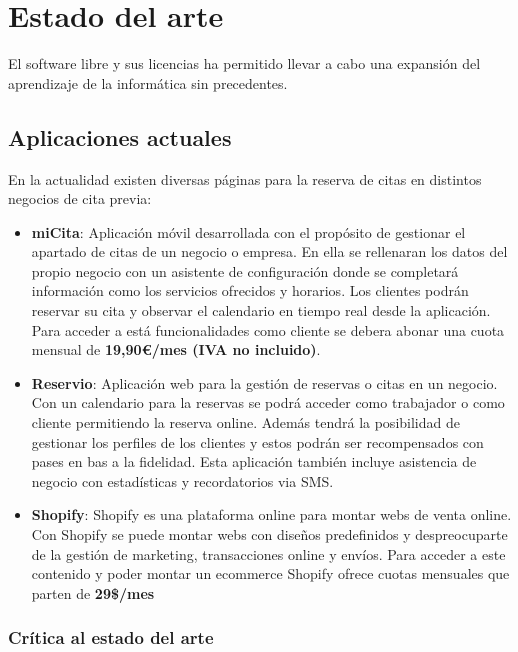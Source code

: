 \chapter{Estado del arte}

El software libre y sus licencias \cite{gplv3} ha permitido llevar a cabo una expansión del
aprendizaje de la informática sin precedentes.

\section{Aplicaciones actuales}

En la actualidad existen diversas páginas para la reserva de citas en distintos negocios de cita previa:

\vspace{-0.5em}
\begin{itemize}
    \item \textbf{miCita}: Aplicación móvil desarrollada con el propósito de gestionar el apartado de citas de un
    negocio o empresa. En ella se rellenaran los datos del propio negocio con un asistente de configuración donde
    se completará información como los servicios ofrecidos y horarios. Los clientes podrán reservar su cita y
    observar el calendario en tiempo real desde la aplicación. Para acceder a está funcionalidades como cliente
    se debera abonar una cuota mensual de \textbf{19,90\euro/mes (IVA no incluido)}.\cite{micita}

    \item \textbf{Reservio}: Aplicación web para la gestión de reservas o citas en un negocio.
    Con un calendario para la reservas se podrá acceder como trabajador o como cliente permitiendo la reserva online.
    Además tendrá la posibilidad de gestionar los perfiles de los clientes  y estos podrán ser recompensados
    con pases en bas a la fidelidad. Esta aplicación también incluye asistencia de negocio con estadísticas y
    recordatorios via SMS.\cite{reservio}

    \item \textbf{Shopify}: Shopify es una plataforma online para montar webs de venta online. Con Shopify se puede
    montar webs con diseños predefinidos y despreocuparte de la gestión de marketing, transacciones online
    y envíos. Para acceder a este contenido y poder montar un ecommerce Shopify ofrece cuotas mensuales que parten de
    \textbf{29\$/mes}\cite{shopify}
\end{itemize}

\subsection{Crítica al estado del arte}

